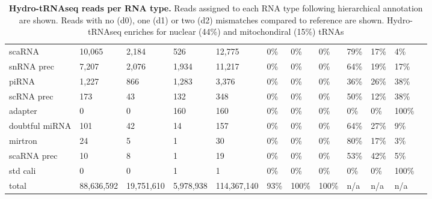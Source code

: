\documentclass[12pt]{rockefeller}
\begin{document}
\begin{table}[h!]
\begin{adjustbox}{max width = \textwidth}
\begin{tabular}{|l|l|l|l|l|l|l|l|l|l|l|l}
         scaRNA &      10,065 &       2,184 &        526 &       12,775 &                0\% &                   0\% &             0\% &                 79\% &      17\% &       4\% \\
     snRNA prec &       7,207 &       2,076 &      1,934 &       11,217 &                0\% &                   0\% &             0\% &                 64\% &      19\% &      17\% \\
          piRNA &       1,227 &         866 &      1,283 &        3,376 &                0\% &                   0\% &             0\% &                 36\% &      26\% &      38\% \\
     scRNA prec &         173 &          43 &        132 &          348 &                0\% &                   0\% &             0\% &                 50\% &      12\% &      38\% \\
        adapter &           0 &           0 &        160 &          160 &                0\% &                   0\% &             0\% &                  0\% &       0\% &     100\% \\
 doubtful miRNA &         101 &          42 &         14 &          157 &                0\% &                   0\% &             0\% &                 64\% &      27\% &       9\% \\
        mirtron &          24 &           5 &          1 &           30 &                0\% &                   0\% &             0\% &                 80\% &      17\% &       3\% \\
    scaRNA prec &          10 &           8 &          1 &           19 &                0\% &                   0\% &             0\% &                 53\% &      42\% &       5\% \\
       std cali &           0 &           0 &          1 &            1 &                0\% &                   0\% &             0\% &                  0\% &       0\% &     100\% \\ \hline
         total  &  88,636,592 &  19,751,610 &  5,978,938 &  114,367,140 &               93\% &                 100\% &           100\% &                 n/a &      n/a &      n/a \\
\hline
  \end{tabular}
  \end{adjustbox}
\caption[Hydro-tRNAseq reads per RNA type]{\textbf{Hydro-tRNAseq reads per RNA type.} Reads assigned to each RNA type following hierarchical annotation are shown. Reads with no (d0), one (d1) or two (d2) mismatches compared to reference are shown. Hydro-tRNAseq enriches for nuclear (44\%) and mitochondiral (15\%) tRNAs}\label{tableS1}
\end{table}
\end{document}

